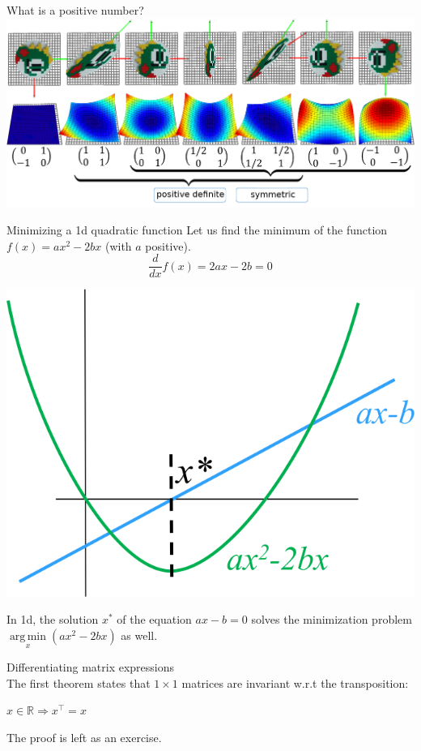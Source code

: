 \documentclass[UKenglish,aspectratio=169]{beamer}
\DeclareMathOperator*{\argmin}{arg\,min}
\begin{document}
\begin{frame}{What is a positive number?}
\includegraphics[width=\linewidth]{../manuscript/img/matrices}
\end{frame}

\begin{frame}{Minimizing a 1d quadratic function}
Let us find the minimum of the function $f(x) = ax^2 - 2bx$ (with $a$ positive).
$$\frac{d}{dx}f(x) = 2ax - 2b = 0$$
\pause
\begin{center}
\includegraphics[width=.3\linewidth]{../manuscript/img/minpb1d}
\end{center}
In 1d, the solution $x^*$ of the equation $ax - b = 0$ solves the minimization problem $\argmin\limits_x(ax^2-2bx)$ as well.
\end{frame}

\begin{frame}{Differentiating matrix expressions}
~\\
The first theorem states that $1\times 1$ matrices are invariant w.r.t the transposition:
\begin{theorem}
$x\in \mathbb R \Rightarrow x^\top = x$
\end{theorem}
The proof is left as an exercise.
\end{frame}
\end{document}
